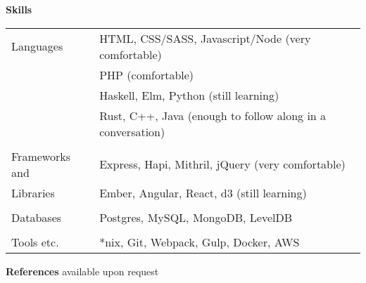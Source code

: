 \documentclass[notitlepage,oneside,draft]{article}
\begin{document}
\begin{flushleft}
  \large
  \textbf{Skills} \\
  \vspace{12pt}
  \normalsize
  \begin{tabular}{ p{86pt} | l  }
    Languages & HTML, CSS/SASS, Javascript/Node (very comfortable) \\
    & PHP (comfortable) \\
    & Haskell, Elm, Python (still learning) \\ 
    & Rust, C++, Java (enough to follow along in a conversation) \\
    & \\
    Frameworks and & Express, Hapi, Mithril, jQuery (very comfortable) \\
    Libraries & Ember, Angular, React, d3 (still learning) \\
    & \\
    Databases & Postgres, MySQL, MongoDB, LevelDB \\
    & \\
    Tools etc. & *nix, Git, Webpack, Gulp, Docker, AWS
  \end{tabular}
  \vspace{24pt}

  
  \large
  \textbf{References}
  \normalsize
  available upon request

\end{flushleft}
\end{document}
